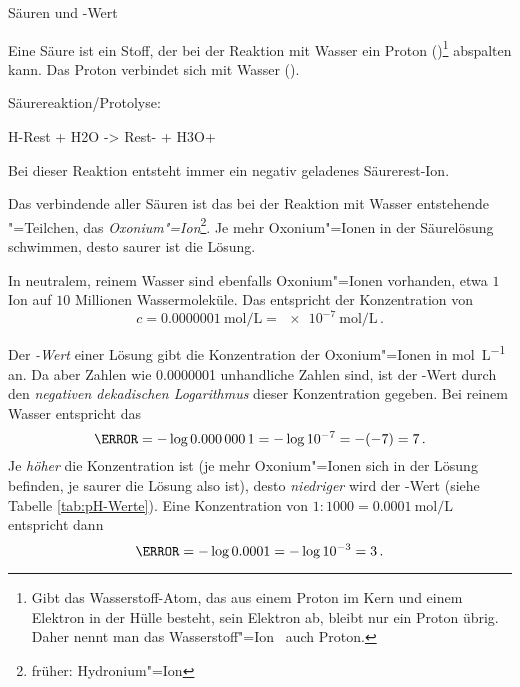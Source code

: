 \documentclass{scrartcl}
\begin{document}
\begin{center}
  \Huge\sffamily Säuren und \pH-Wert
\end{center}

Eine Säure ist ein Stoff, der bei der Reaktion mit Wasser ein Proton
(\Hpl)\footnote{Gibt das Wasserstoff-Atom, das aus einem Proton im Kern und
  einem Elektron in der Hülle besteht, sein Elektron ab, bleibt nur ein Proton
  übrig. Daher nennt man das Wasserstoff"=Ion \Hpl\ auch Proton.} abspalten
kann.  Das Proton verbindet sich mit Wasser ().
\begin{definition}
  Säurereaktion\slash Protolyse:
  \begin{reaction*}
    H-Rest + H2O -> Rest- + H3O+
  \end{reaction*}
\end{definition}
Bei dieser Reaktion entsteht immer ein negativ geladenes Säurerest-Ion.

Das verbindende aller Säuren ist das bei der Reaktion mit Wasser entstehende
"=Teilchen, das \emph{Oxonium"=Ion}\footnote{früher: Hydronium"=Ion}.
Je mehr Oxonium"=Ionen in der Säurelösung schwimmen, desto saurer ist die
Lösung.

In neutralem, reinem Wasser sind ebenfalls Oxonium"=Ionen vorhanden, etwa $1$
Ion auf $10$ Millionen Wassermoleküle.  Das entspricht der Konzentration von
\begin{equation}
  c = \SI{0.0000001}{\mole\per\liter} = \SI{e-7}{\mole\per\liter} \,.
  \label{eq:aquadest}
\end{equation}

Der \emph{\pH-Wert} einer Lösung gibt die Konzentration der Oxonium"=Ionen in
\si{\mole\per\liter} an.  Da aber Zahlen wie \num{0.0000001} unhandliche
Zahlen sind, ist der \pH-Wert durch den \emph{negativen dekadischen
  Logarithmus} dieser Konzentration gegeben.  Bei reinem Wasser entspricht das
\begin{equation}
  \pH = -\log\num{0.0000001} = -\log 10^{-7} = -(-7) = 7 \,.
\end{equation}
Je \emph{höher} die Konzentration ist (je mehr Oxonium"=Ionen sich in der
Lösung befinden, je saurer die Lösung also ist), desto \emph{niedriger} wird
der \pH-Wert (siehe Tabelle \ref{tab:pH-Werte}).  Eine Konzentration von
$\num{1}:\num{1000} = \SI{0.0001}{\mole\per\liter}$ entspricht dann
\begin{equation}
  \pH = -\log\num{0.0001} = -\log 10^{-3} = 3 \,.
\end{equation}
\end{document}
